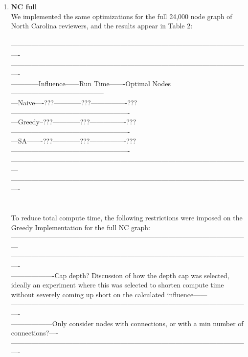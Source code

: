 \documentclass[11pt]{scrartcl} %
\begin{document}
\begin{enumerate}
\item \textbf{NC full}\\
We implemented the same optimizations for the full 24,000 node graph of North Carolina reviewers, and the results appear in Table 2:\\
\\
----------------------------------------------------------------------------------------------------------\\
----------------------------------------------------------------------------------------------------------\\
------------Influence------Run Time-------Optimal Nodes-----------------------------------------\\
---Naive----???------------???----------------???----------------------------------------------------\\
---Greedy--???------------???----------------???----------------------------------------------------\\
---SA-------???------------???----------------???----------------------------------------------------\\
---------------------------------------------------------------------------------------------------------\\
----------------------------------------------------------------------------------------------------------\\
\\
\\
To reduce total compute time, the following restrictions were imposed on the Greedy Implementation for the full NC graph:\\
---------------------------------------------------------------------------------------------------------\\
----------------------------------------------------------------------------------------------------------\\
-------------------Cap depth?  Discussion of how the depth cap was selected, ideally an experiment where this was selected to shorten compute time without severely coming up short on the calculated influence------\\
----------------------------------------------------------------------------------------------------------\\
------------------Only consider nodes with connections, or with a min number of connections?----\\
----------------------------------------------------------------------------------------------------------\\

\end{enumerate}
\end{document}
